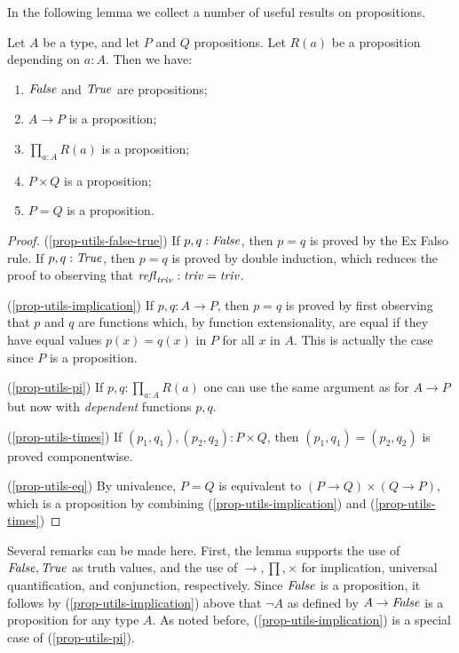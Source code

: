 In the following lemma we collect a number of useful results on propositions.

\begin{lemma}\label{lem:prop_utils}
Let $A$ be a type, and let $P$ and $Q$ propositions.
Let $R(a)$ be a proposition depending on $a:A$. Then we have:
\begin{enumerate}
\item\label{prop-utils-false-true} $\mathop{\mathit{False}}$ and $\mathop{\mathit{True}}$ are propositions;
\item\label{prop-utils-implication} $A\to P$ is a proposition;
\item\label{prop-utils-pi} $\prod_{a:A} R(a)$ is a proposition;
\item\label{prop-utils-times} $P\times Q$ is a proposition;
\item\label{prop-utils-eq} $P = Q$ is a proposition.
\end{enumerate}
\end{lemma}

\begin{proof}
(\ref{prop-utils-false-true})
If $p,q : \mathop{\mathit{False}}$, then $p=q$ is proved by the Ex Falso rule.
If $p,q : \mathop{\mathit{True}}$, then $p=q$ is proved by double induction,
which reduces the proof to observing that $\mathop{{\it refl}_{\mathop{\mathit{triv}}}}: \mathop{\mathit{triv}}=\mathop{\mathit{triv}}$.

(\ref{prop-utils-implication})
If $p,q : A\to P$, then $p=q$ is proved by first observing that $p$ and $q$
are functions which, by function extensionality, are equal if they have
equal values $p(x) = q(x)$ in $P$ for all $x$ in $A$. This is
actually the case since $P$ is a proposition.

(\ref{prop-utils-pi})
If $p,q : \prod_{a:A} R(a)$ one can use the same argument as for $A\to P$
but now with \emph{dependent} functions $p,q$.

(\ref{prop-utils-times})
If $(p_1,q_1),(p_2,q_2) : P\times Q$, then $(p_1,q_1)=(p_2,q_2)$
is proved componentwise. 

(\ref{prop-utils-eq})
By univalence, $P = Q$ is equivalent to
$(P\to Q)\times(Q\to P)$, which is a proposition by 
combining (\ref{prop-utils-implication}) and
(\ref{prop-utils-times})
\end{proof}

Several remarks can be made here. First, the lemma supports the
use of $\mathop{\mathit{False}},\mathop{\mathit{True}}$ as truth values, and the use of
$\to,\prod,\times$ for implication, universal quantification,
and conjunction, respectively. Since $\mathop{\mathit{False}}$ is a proposition,
it follows by (\ref{prop-utils-implication}) above that
$\neg A$ as defined by $A\to\mathop{\mathit{False}}$ is a proposition for any type $A$.
As noted before, (\ref{prop-utils-implication}) is a
special case of (\ref{prop-utils-pi}).

